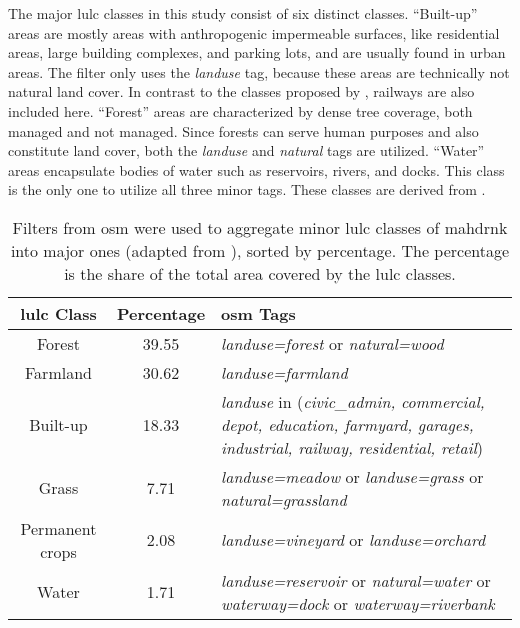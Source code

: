 The major \gls{lulc} classes in this study consist of six distinct classes. \enquote{Built-up} areas are mostly areas with anthropogenic impermeable surfaces, like residential areas, large building complexes, and parking lots, and are usually found in urban areas. The filter only uses the \emph{landuse} tag, because these areas are technically not natural land cover. In contrast to the classes proposed by \textcite{Schott.Zell.ea2024}, railways are also included here. \enquote{Forest} areas are characterized by dense tree coverage, both managed and not managed. Since forests can serve human purposes and also constitute land cover, both the \emph{landuse} and \emph{natural} tags are utilized. \enquote{Water} areas encapsulate bodies of water such as reservoirs, rivers, and docks. This class is the only one to utilize all three minor tags. These classes are derived from \textcite{Schott.Zell.ea2024}.

\begin{table}[htb]
    \centering
    \caption[ Filters for the  Classes of ]{Filters from \gls{osm} were used to aggregate minor \gls{lulc} classes of \gls{mahdrnk} into major ones (adapted from \textcite{Schott.Zell.ea2024}), sorted by percentage. The percentage is the share of the total area covered by the \gls{lulc} classes.}
    \begin{tabular}{ccp{}}
        \toprule
        \textbf{\gls{lulc} Class} & \textbf{Percentage} & \textbf{\gls{osm} Tags} \\
        \midrule
        Forest & 39.55 & \emph{landuse=forest} or \emph{natural=wood} \\
        Farmland & 30.62 & \emph{landuse=farmland} \\
        Built-up & 18.33 & \emph{landuse} in (\emph{civic\_admin, commercial, depot, education, farmyard, garages, industrial, railway, residential, retail}) \\
        Grass & 7.71 & \emph{landuse=meadow} or \emph{landuse=grass} or \emph{natural=grassland} \\
        Permanent crops & 2.08 & \emph{landuse=vineyard} or \emph{landuse=orchard} \\
        Water & 1.71 & \emph{landuse=reservoir} or \emph{natural=water} or \emph{waterway=dock} or \emph{waterway=riverbank} \\
        \bottomrule
    \end{tabular}
    \label{tab:lulc}
\end{table}

